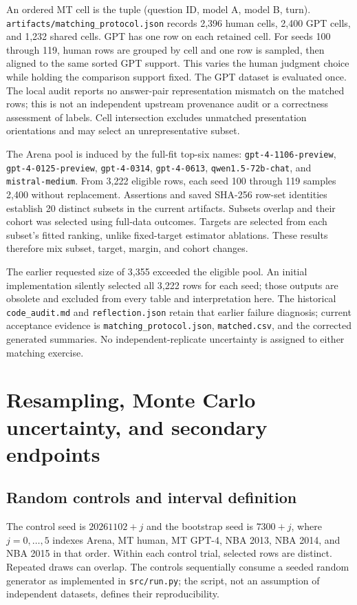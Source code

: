An ordered MT cell is the tuple (question ID, model A, model B, turn). \texttt{artifacts/matching\_protocol.json} records 2,396 human cells, 2,400 GPT cells, and 1,232 shared cells. GPT has one row on each retained cell. For seeds 100 through 119, human rows are grouped by cell and one row is sampled, then aligned to the same sorted GPT support. This varies the human judgment choice while holding the comparison support fixed. The GPT dataset is evaluated once. The local audit reports no answer-pair representation mismatch on the matched rows; this is not an independent upstream provenance audit or a correctness assessment of labels. Cell intersection excludes unmatched presentation orientations and may select an unrepresentative subset.

The Arena pool is induced by the full-fit top-six names: \texttt{gpt-4-1106-preview}, \texttt{gpt-4-0125-preview}, \texttt{gpt-4-0314}, \texttt{gpt-4-0613}, \texttt{qwen1.5-72b-chat}, and \texttt{mistral-medium}. From 3,222 eligible rows, each seed 100 through 119 samples 2,400 without replacement. Assertions and saved SHA-256 row-set identities establish 20 distinct subsets in the current artifacts. Subsets overlap and their cohort was selected using full-data outcomes. Targets are selected from each subset's fitted ranking, unlike fixed-target estimator ablations. These results therefore mix subset, target, margin, and cohort changes.

The earlier requested size of 3,355 exceeded the eligible pool. An initial implementation silently selected all 3,222 rows for each seed; those outputs are obsolete and excluded from every table and interpretation here. The historical \texttt{code\_audit.md} and \texttt{reflection.json} retain that earlier failure diagnosis; current acceptance evidence is \texttt{matching\_protocol.json}, \texttt{matched.csv}, and the corrected generated summaries. No independent-replicate uncertainty is assigned to either matching exercise.

\section{Resampling, Monte Carlo uncertainty, and secondary endpoints}
\label{app:uncertainty}
\subsection{Random controls and interval definition}
The control seed is $20261102+j$ and the bootstrap seed is $7300+j$, where $j=0,\ldots,5$ indexes Arena, MT human, MT GPT-4, NBA 2013, NBA 2014, and NBA 2015 in that order. Within each control trial, selected rows are distinct. Repeated draws can overlap. The controls sequentially consume a seeded random generator as implemented in \texttt{src/run.py}; the script, not an assumption of independent datasets, defines their reproducibility.

